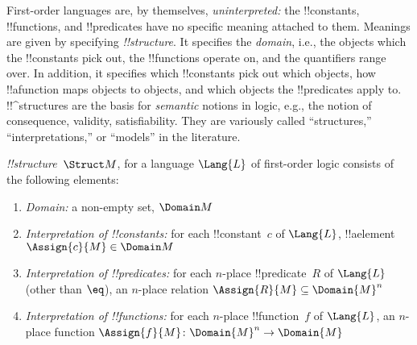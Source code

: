 \documentclass[../../../include/open-logic-section]{subfiles}
\begin{document}

\begin{explain}
First-order languages are, by themselves, \emph{uninterpreted:} the
!!{constant}s, !!{function}s, and !!{predicate}s have no specific
meaning attached to them.  Meanings are given by specifying
 \emph{!!{structure}}. It specifies the
\emph{domain}, i.e., the objects which the !!{constant}s pick out, the
!!{function}s operate on, and the quantifiers range over. In addition,
it specifies which !!{constant}s pick out which objects, how
!!a{function} maps objects to objects, and which objects the
!!{predicate}s apply to.  !!^{structure}s are the basis for
\emph{semantic} notions in logic, e.g., the notion of consequence,
validity, satisfiability. They are variously called ``structures,''
``interpretations,'' or ``models'' in the literature.
\end{explain}

\begin{defn}[!!^{structure}s]
 \emph{!!{structure}}~$\Struct M$, for a language
$\Lang{L}$ of first-order logic consists of the following elements:
\begin{enumerate}
\item \emph{Domain:} a non-empty set, $\Domain M$
\item \emph{Interpretation of !!{constant}s:} for each !!{constant}~$c$ of
  $\Lang{L}$, !!a{element} $\Assign{c}{M} \in \Domain M$
\item \emph{Interpretation of !!{predicate}s:} for each $n$-place
  !!{predicate}~$R$ of $\Lang{L}$ (other than $\eq$), an $n$-place
  relation $\Assign{R}{M} \subseteq \Domain{M}^n$
\item \emph{Interpretation of !!{function}s:} for each $n$-place
  !!{function}~$f$ of $\Lang{L}$, an $n$-place function $\Assign{f}{M}
  \colon \Domain{M}^n \to \Domain{M}$
\end{enumerate}
\end{defn}
\end{document}
